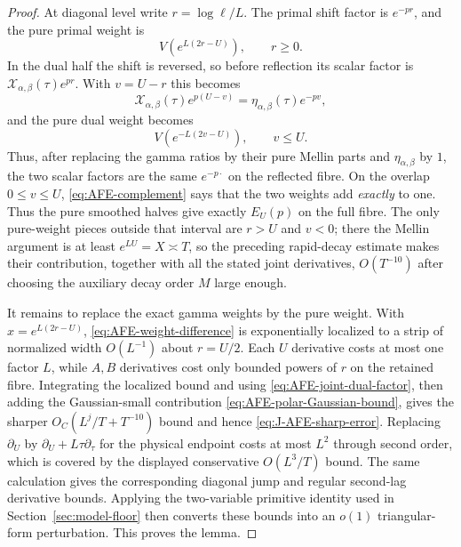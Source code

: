 \begin{proof}
At diagonal level write $r=\log\ell/L$.  The primal shift factor is $e^{-pr}$,
and the pure primal weight is
\[
V\!\left(e^{L(2r-U)}\right),
\qquad r\ge0.
\]
In the dual half the shift is reversed, so before reflection its scalar factor
is $\mathcal X_{\alpha,\beta}(\tau)e^{pr}$.  With $v=U-r$ this becomes
\[
\mathcal X_{\alpha,\beta}(\tau)e^{p(U-v)}
=\eta_{\alpha,\beta}(\tau)e^{-pv},
\]
and the pure dual weight becomes
\[
V\!\left(e^{-L(2v-U)}\right),
\qquad v\le U.
\]
Thus, after replacing the gamma ratios by their pure Mellin parts and
$\eta_{\alpha,\beta}$ by $1$, the two scalar factors are the same $e^{-p\cdot}$
on the reflected fibre.  On the overlap $0\le v\le U$,
\eqref{eq:AFE-complement} says that the two weights add \emph{exactly} to one.
Thus the pure smoothed halves give exactly $E_U(p)$ on the full fibre.  The only
pure-weight pieces outside that interval are $r>U$ and $v<0$; there the Mellin
argument is at least $e^{LU}=X\asymp T$, so the preceding rapid-decay estimate
makes their contribution, together with all the stated joint derivatives,
$O(T^{-10})$ after choosing the auxiliary decay order $M$ large enough.

It remains to replace the exact gamma weights by the pure weight.  With
$x=e^{L(2r-U)}$, \eqref{eq:AFE-weight-difference} is exponentially localized to
a strip of normalized width $O(L^{-1})$ about $r=U/2$.  Each $U$ derivative
costs at most one factor $L$, while $A,B$ derivatives cost only bounded powers
of $r$ on the retained fibre.  Integrating the localized bound and using
\eqref{eq:AFE-joint-dual-factor}, then adding the Gaussian-small contribution
\eqref{eq:AFE-polar-Gaussian-bound}, gives the sharper
$O_C(L^j/T+T^{-10})$ bound and hence
\eqref{eq:J-AFE-sharp-error}.  Replacing $\partial_U$ by
$\partial_U+L\tau\partial_\tau$ for the physical endpoint costs at most $L^2$
through second order, which is covered by the displayed conservative
$O(L^3/T)$ bound.  The same calculation gives the corresponding diagonal jump
and regular second-lag derivative bounds.  Applying the two-variable primitive identity
used in Section~\ref{sec:model-floor} then converts these bounds into an
$o(1)$ triangular-form perturbation.  This proves the lemma.
\end{proof}

